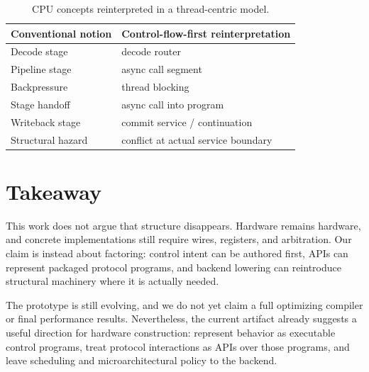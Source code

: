 \documentclass[conference]{IEEEtran}
\begin{document}
\begin{table}[t]
\centering
\small
\begin{tabular}{@{}ll@{}}
\toprule
Conventional notion & Control-flow-first reinterpretation \\
\midrule
Decode stage & decode router \\
Pipeline stage & async call segment \\
Backpressure & thread blocking \\
Stage handoff & async call into program \\
Writeback stage & commit service / continuation \\
Structural hazard & conflict at actual service boundary \\
\bottomrule
\end{tabular}
\caption{CPU concepts reinterpreted in a thread-centric model.}
\end{table}

\section{Takeaway}
This work does not argue that structure disappears. Hardware remains hardware, and concrete implementations still require wires, registers, and arbitration. Our claim is instead about factoring: control intent can be authored first, APIs can represent packaged protocol programs, and backend lowering can reintroduce structural machinery where it is actually needed.

The prototype is still evolving, and we do not yet claim a full optimizing compiler or final performance results. Nevertheless, the current artifact already suggests a useful direction for hardware construction: represent behavior as executable control programs, treat protocol interactions as APIs over those programs, and leave scheduling and microarchitectural policy to the backend.
\end{document}
